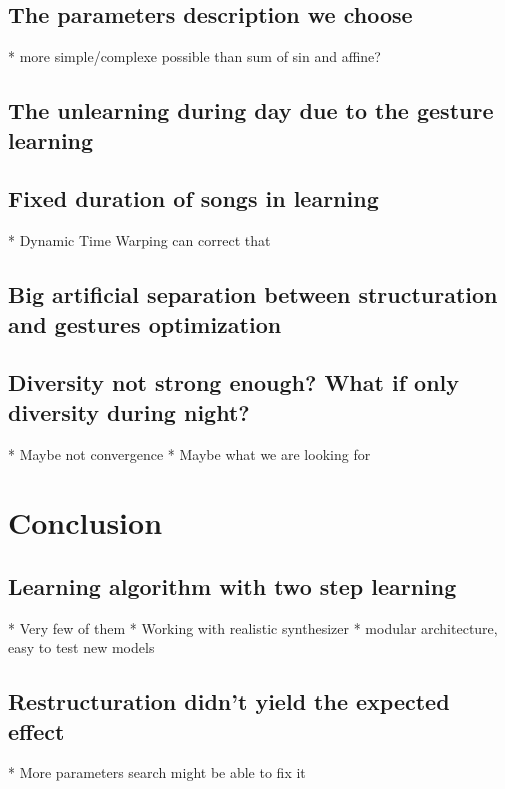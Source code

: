 \documentclass{report}
\begin{document}
\section{The parameters description we
choose}\label{the-parameters-description-we-choose}

  * more simple/complexe possible than sum of sin and affine?
\section{The unlearning during day due to the gesture
learning}\label{the-unlearning-during-day-due-to-the-gesture-learning}

\section{Fixed duration of songs in
learning}\label{fixed-duration-of-songs-in-learning}

  * Dynamic Time Warping can correct that
\section{Big artificial separation between structuration and gestures
optimization}\label{big-artificial-separation-between-structuration-and-gestures-optimization}

\section{Diversity not strong enough? What if only diversity during
night?}\label{diversity-not-strong-enough-what-if-only-diversity-during-night}

  * Maybe not convergence
  * Maybe what we are looking for
\chapter{Conclusion}\label{conclusion}

\section{Learning algorithm with two step
learning}\label{learning-algorithm-with-two-step-learning}

  * Very few of them
  * Working with realistic synthesizer
  * modular architecture, easy to test new models
\section{Restructuration didn't yield the expected
effect}\label{restructuration-didnt-yield-the-expected-effect}

 * More parameters search might be able to fix it

\printbibliography{}
\end{document}
